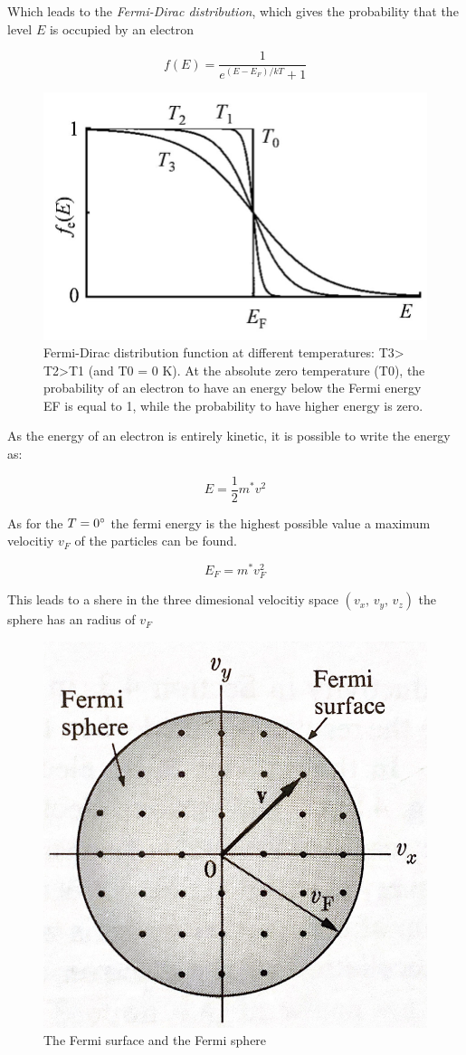 Which leads to the \textit{Fermi-Dirac distribution}, which gives
the probability that the level $E$ is occupied by an electron

\begin{equation}
    f(E) = \frac{1}{e^{(E-E_F)/kT}+1}
\end{equation}

\begin{figure}[H]
    \centering
    \includegraphics[width=0.5\linewidth]{Graphics/Chapter1/Fermi-Dirac-distribution.png}
    \caption{Fermi-Dirac distribution function at different temperatures: T3> T2>T1
     (and T0 = 0 K). At the absolute zero temperature (T0), the probability of an 
     electron to have an energy below the Fermi energy EF is equal to 1, while the 
     probability to have higher energy is zero.}
    \label{}
\end{figure}

As the energy of an electron is entirely kinetic, it is possible
to write the energy as:

$$E = \frac{1}{2} m^* v^2$$

As for the $T=0 \degree$ the fermi energy is the highest possible value
a maximum velocitiy $v_F$ of the particles can be found. 

$$E_F = m^*v_F^2$$

This leads to a shere in the three dimesional velocitiy space
$(v_x, \, v_y, \, v_z)$ the sphere has an radius of $v_F$


\begin{figure}[H]
    \centering
    \includegraphics[width=0.4\linewidth]{Graphics/Chapter1/Fermi_Sphere.png}
    \caption{The Fermi surface and the Fermi sphere \cite[Elementary Solid State Physics p. 268]{elementary_SSP} }
    \label{}
\end{figure}

